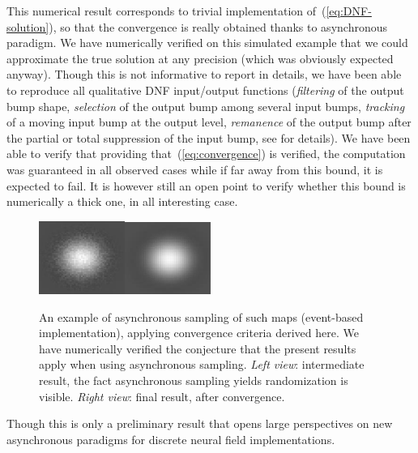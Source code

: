 This numerical result corresponds to trivial implementation of~(\ref{eq:DNF-solution}), so that the convergence is really obtained thanks to asynchronous paradigm. We have numerically verified on this simulated example that we could approximate the true solution at any precision (which was obviously expected anyway). Though this is not informative to report in details, we have been able to reproduce all qualitative DNF input/output functions ({\em filtering} of the output bump shape, {\em selection} of the output bump among several input bumps, {\em tracking} of a moving input bump at the output level, {\em remanence} of the output bump after the partial or total suppression of the input bump, see \cite{Alexandre:2009} for details). We have been able to verify that providing that~(\ref{eq:convergence}) is verified, the computation was guaranteed in all observed cases while if far away from this bound, it is expected to fail. It is however still an open point to verify whether this bound is numerically a thick one, in all interesting case.
\begin{figure}[ht]
\centerline{\includegraphics[width=0.25\textwidth,height=0.25\textwidth]{Chapitres/PublicationsSample/Revue/fig2a.jpeg}\includegraphics[width=0.25\textwidth,height=0.25\textwidth]{Chapitres/PublicationsSample/Revue/fig2b.jpeg}}
 \caption{An example of asynchronous sampling of such maps (event-based implementation), applying convergence criteria derived here.  We have numerically verified the conjecture that the present results apply when using asynchronous sampling.  {\em Left view}: intermediate result, the fact asynchronous sampling yields randomization is visible.  {\em Right view}: final result, after convergence.}
\label{fig:bump} 
\end{figure}
Though this is only a preliminary result that opens large perspectives on new asynchronous paradigms for discrete neural field implementations.
